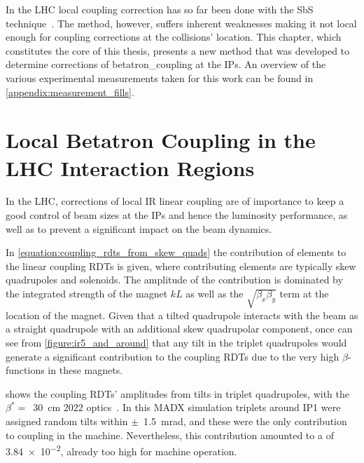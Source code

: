 In the LHC local coupling correction has so far been done with the SbS technique~\cite{PRAB:Tomas:CERN_LHC_OMC}.
The method, however, suffers inherent weaknesses making it not local enough for coupling corrections at the collisions' location.
This chapter, which constitutes the core of this thesis, presents a new method that was developed to determine corrections of \gls{betatron_coupling} at the \glspl{IP}.
An overview of the various experimental measurements taken for this work can be found in \cref{appendix:measurement_fills}.


\section{Local Betatron Coupling in the LHC Interaction Regions}
\label{section:local_ir_coupling}

In the LHC, corrections of local \gls{IR} linear coupling are of importance to keep a good control of beam sizes at the IPs and hence the luminosity performance, as well as to prevent a significant impact on the beam dynamics.

In \cref{equation:coupling_rdts_from_skew_quads} the contribution of elements to the linear coupling \glspl{RDT} is given, where contributing elements are typically skew quadrupoles and solenoids.
The amplitude of the contribution is dominated by the integrated strength of the magnet \(k L\) as well as the \(\sqrt{\beta_x \beta_y}\) term at the location of the magnet.
Given that a tilted quadrupole interacts with the beam as a straight quadrupole with an additional \gls{skew} quadrupolar component, once can see from \cref{figure:ir5_and_around} that any tilt in the triplet quadrupoles would generate a significant contribution to the coupling RDTs due to the very high \(\beta\)-functions in these magnets.

 shows the coupling RDTs' amplitudes from tilts in triplet quadrupoles, with the \(\beta^{\ast} =\)~\qty{30}{\centi\meter} \num{2022} optics~\cite{CODE:acc-models-lhc}.
In this \gls{MADX} simulation triplets around IP\num{1} were assigned random tilts within \(\pm\)~\qty{1.5}{\milli\radian}, and these were the only contribution to coupling in the machine.
Nevertheless, this contribution amounted to a  of \num{3.84e-2}, already too high for machine operation.

